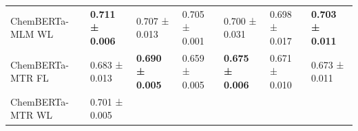 \documentclass[
  10pt,
]{article}
\begin{document}
\begin{longtable}[]{@{}lllllll@{}}
\begin{minipage}[t]{0.12\columnwidth}
ChemBERTa-MLM WL\strut
\end{minipage} & \begin{minipage}[t]{0.12\columnwidth}\raggedright
\textbf{0.711 ± 0.006}\strut
\end{minipage} & \begin{minipage}[t]{0.12\columnwidth}\raggedright
0.707 ± 0.013\strut
\end{minipage} & \begin{minipage}[t]{0.12\columnwidth}\raggedright
0.705 ± 0.001\strut
\end{minipage} & \begin{minipage}[t]{0.12\columnwidth}\raggedright
0.700 ± 0.031\strut
\end{minipage} & \begin{minipage}[t]{0.12\columnwidth}\raggedright
0.698 ± 0.017\strut
\end{minipage} & \begin{minipage}[t]{0.12\columnwidth}\raggedright
\textbf{0.703 ± 0.011}\strut
\end{minipage}\tabularnewline
\begin{minipage}[t]{0.12\columnwidth}\raggedright
ChemBERTa-MTR FL\strut
\end{minipage} & \begin{minipage}[t]{0.12\columnwidth}\raggedright
0.683 ± 0.013\strut
\end{minipage} & \begin{minipage}[t]{0.12\columnwidth}\raggedright
\textbf{0.690 ± 0.005}\strut
\end{minipage} & \begin{minipage}[t]{0.12\columnwidth}\raggedright
0.659 ± 0.005\strut
\end{minipage} & \begin{minipage}[t]{0.12\columnwidth}\raggedright
\textbf{0.675 ± 0.006}\strut
\end{minipage} & \begin{minipage}[t]{0.12\columnwidth}\raggedright
0.671 ± 0.010\strut
\end{minipage} & \begin{minipage}[t]{0.12\columnwidth}\raggedright
0.673 ± 0.011\strut
\end{minipage}\tabularnewline
\begin{minipage}[t]{0.12\columnwidth}\raggedright
ChemBERTa-MTR WL\strut
\end{minipage} & \begin{minipage}[t]{0.12\columnwidth}\raggedright
0.701 ± 0.005\strut
\end{minipage} & \begin{minipage}[t]{0.12\columnwidth}\raggedright

\end{minipage}
\end{longtable}
\end{document}
